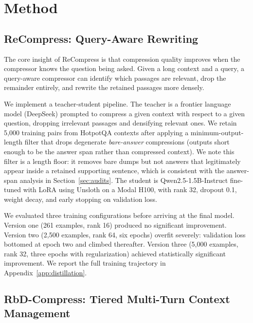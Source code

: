 \documentclass{article}
\begin{document}
\section{Method}

\subsection{ReCompress: Query-Aware Rewriting}

The core insight of ReCompress is that compression quality improves when
the compressor knows the question being asked. Given a long context and
a query, a query-aware compressor can identify which passages are
relevant, drop the remainder entirely, and rewrite the retained passages
more densely.

We implement a teacher-student pipeline. The teacher is a frontier
language model (DeepSeek) prompted to compress a given context with
respect to a given question, dropping irrelevant passages and densifying
relevant ones. We retain 5,000 training pairs from HotpotQA contexts after
applying a minimum-output-length filter that drops degenerate
\emph{bare-answer} compressions (outputs short enough to be the answer span
rather than compressed context). We note this filter is a length floor: it
removes bare dumps but not answers that legitimately appear inside a retained
supporting sentence, which is consistent with the answer-span analysis in
Section~\ref{sec:audits}. The student is
Qwen2.5-1.5B-Instruct \cite{qwen2025qwen25} fine-tuned with LoRA
\cite{hu2021lora} using Unsloth on a Modal H100, with rank 32, dropout
0.1, weight decay, and early stopping on validation loss.

We evaluated three training configurations before arriving at the final
model. Version one (261 examples, rank 16) produced no significant
improvement. Version two (2,500 examples, rank 64, six epochs) overfit
severely: validation loss bottomed at epoch two and climbed thereafter.
Version three (5,000 examples, rank 32, three epochs with regularization)
achieved statistically significant improvement. We report the full
training trajectory in Appendix~\ref{app:distillation}.

\subsection{RbD-Compress: Tiered Multi-Turn Context Management}
\end{document}
